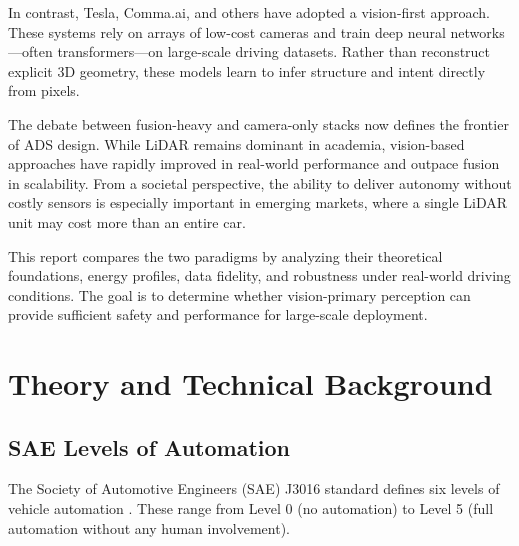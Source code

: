 \documentclass[12pt]{article}
\begin{document}
In contrast, Tesla, Comma.ai, and others have adopted a vision-first approach. These systems rely on arrays of low-cost cameras and train deep neural networks—often transformers—on large-scale driving datasets. Rather than reconstruct explicit 3D geometry, these models learn to infer structure and intent directly from pixels.

The debate between fusion-heavy and camera-only stacks now defines the frontier of ADS design. While LiDAR remains dominant in academia, vision-based approaches have rapidly improved in real-world performance and outpace fusion in scalability. From a societal perspective, the ability to deliver autonomy without costly sensors is especially important in emerging markets, where a single LiDAR unit may cost more than an entire car.

This report compares the two paradigms by analyzing their theoretical foundations, energy profiles, data fidelity, and robustness under real-world driving conditions. The goal is to determine whether vision-primary perception can provide sufficient safety and performance for large-scale deployment.

\section{Theory and Technical Background}

\subsection{SAE Levels of Automation}

The Society of Automotive Engineers (SAE) J3016 standard defines six levels of
vehicle automation \cite{SAEJ3016_2021}. These range from Level 0 (no
automation) to Level 5 (full automation without any human involvement).
\end{document}
